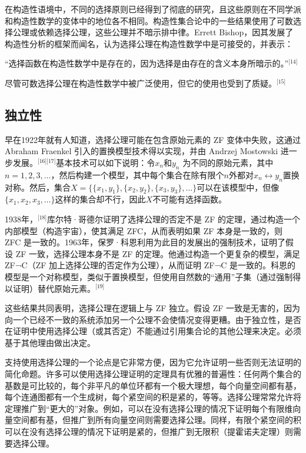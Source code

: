 在构造性语境中，不同的选择原则已经得到了彻底的研究，且这些原则在不同学派和构造性数学的变体中的地位各不相同。构造性集合论中的一些结果使用了可数选择公理或依赖选择公理，这些公理并不暗示排中律。Errett Bishop，因其发展了构造性分析的框架而闻名，认为选择公理在构造性数学中是可接受的，并表示：

“选择函数在构造性数学中是存在的，因为选择是由存在的含义本身所暗示的。”\(^\text{[14]}\)

尽管可数选择公理在构造性数学中被广泛使用，但它的使用也受到了质疑。\(^\text{[15]}\)
\subsection{独立性}  
早在1922年就有人知道，选择公理可能在包含原始元素的 ZF 变体中失败，这通过 Abraham Fraenkel 引入的置换模型技术得以实现，并由 Andrzej Mostowski 进一步发展。\(^\text{[16][17]}\)基本技术可以如下说明：令\(x_n\)和\(y_n\) 为不同的原始元素，其中\(n = 1, 2, 3, \dots\)，然后构建一个模型，其中每个集合在除有限个\(n\)外都对\(x_n \leftrightarrow y_n\)置换对称。然后，集合\(X = \{\{x_1, y_1\}, \{x_2, y_2\}, \{x_3, y_3\}, \dots\}\)可以在该模型中，但像\(\{x_1, x_2, x_3, \dots\}\)这样的集合却不行，因此\(X\)不可能有选择函数。

1938年，\(^\text{[18]}\)库尔特·哥德尔证明了选择公理的否定不是 ZF 的定理，通过构造一个内部模型（构造宇宙），使其满足 ZFC，从而表明如果 ZF 本身是一致的，则 ZFC 是一致的。1963年，保罗·科恩利用为此目的发展出的强制技术，证明了假设 ZF 一致，选择公理本身不是 ZF 的定理。他通过构造一个更复杂的模型，满足 ZF¬C（ZF 加上选择公理的否定作为公理），从而证明 ZF¬C 是一致的。科恩的模型是一个对称模型，类似于置换模型，但使用自然数的“通用”子集（通过强制得以证明）替代原始元素。\(^\text{[19]}\)

这些结果共同表明，选择公理在逻辑上与 ZF 独立。假设 ZF 一致是无害的，因为向一个已经不一致的系统添加另一个公理不会使情况变得更糟。由于独立性，是否在证明中使用选择公理（或其否定）不能通过引用集合论的其他公理来决定。必须基于其他理由做出决定。

支持使用选择公理的一个论点是它非常方便，因为它允许证明一些否则无法证明的简化命题。许多可以使用选择公理证明的定理具有优雅的普遍性：任何两个集合的基数是可比较的，每个非平凡的单位环都有一个极大理想，每个向量空间都有基，每个连通图都有一个生成树，每个紧空间的积是紧的，等等。选择公理常常允许将定理推广到“更大的”对象。例如，可以在没有选择公理的情况下证明每个有限维向量空间都有基，但推广到所有向量空间则需要选择公理。同样，有限个紧空间的积可以在没有选择公理的情况下证明是紧的，但推广到无限积（提霍诺夫定理）则需要选择公理。

